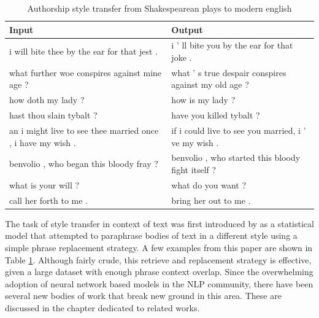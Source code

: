 \begin{table}[ht]
	\centering
	\begin{tabular}{ | p{.45\linewidth} | p{.45\linewidth} | }
		\hline
		\textbf{Input}                                              & \textbf{Output}                                      \\
		\hline \hline
		i will bite thee by the ear for that jest .                 & i ’ ll bite you by the ear for that joke .           \\
		\hline
		what further woe conspires against mine age ?               & what ’ s true despair conspires against my old age ? \\
		\hline
		how doth my lady ?                                          & how is my lady ?                                     \\
		\hline
		hast thou slain tybalt ?                                    & have you killed tybalt ?                             \\
		\hline
		an i might live to see thee married once , i have my wish . & if i could live to see you married, i ’ ve my wish . \\
		\hline
		benvolio , who began this bloody fray ?                     & benvolio , who started this bloody fight itself ?    \\
		\hline
		what is your will ?                                         & what do you want ?                                   \\
		\hline
		call her forth to me .                                      & bring her out to me .                                \\
		\hline
	\end{tabular}
	\caption{Authorship style transfer from Shakespearean plays to modern english}
	\label{tab:paraphrasing-for-style-results}
\end{table}

The task of style transfer in context of text was first introduced by \cite{xu2012paraphrasing} as a statistical model that attempted to paraphrase bodies of text in a different style using a simple phrase replacement strategy. A few examples from this paper are shown in Table \ref{tab:paraphrasing-for-style-results}. Although fairly crude, this retrieve and replacement strategy is effective, given a large dataset with enough phrase context overlap. Since the overwhelming adoption of neural network based models in the NLP community, there have been several new bodies of work that break new ground in this area. These are discussed in the chapter dedicated to related works.



